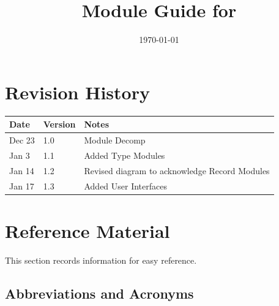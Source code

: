 \documentclass[12pt, titlepage]{article}
\begin{document}
\title{Module Guide for \progname{}}
\author{\authname}
\date{\today}

\maketitle


\section{Revision History}

\begin{tabularx}{\textwidth}{p{3cm}p{2cm}X}
  \toprule {\bf Date} & {\bf Version} & {\bf Notes}                                   \\
  \midrule
  Dec 23              & 1.0           & Module Decomp                                 \\
  Jan 3               & 1.1           & Added Type Modules                            \\
  Jan 14              & 1.2           & Revised diagram to acknowledge Record Modules \\
  Jan 17              & 1.3           & Added User Interfaces                         \\

  \bottomrule
\end{tabularx}

\newpage

\section{Reference Material}

This section records information for easy reference.

\subsection{Abbreviations and Acronyms}
\end{document}
